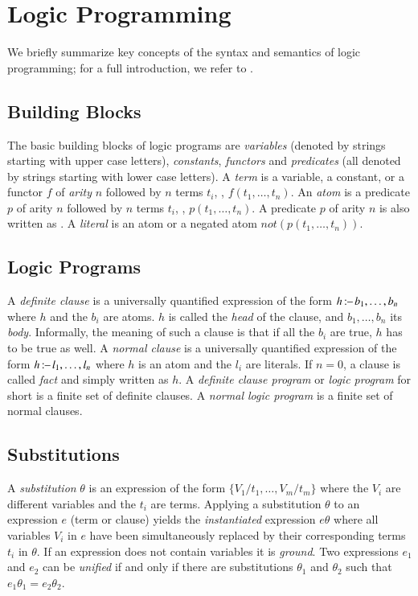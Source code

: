 \section{Logic Programming}
\label{app:lp_new}



We briefly summarize key concepts of the syntax and semantics of logic programming; for a full introduction, we refer to \citep{lloyd2012foundations}.

\subsection{Building Blocks}
The basic building blocks of logic programs are \emph{variables} (denoted by strings starting with upper case letters), \emph{constants}, \emph{functors} and
\emph{predicates} (all denoted by strings starting with lower case letters).  A \emph{term} is a variable, a constant, or a functor
$f$ of \emph{arity} $n$ followed by $n$ terms $t_i$, \ie,
$f(t_1,\dots,t_n)$. 
An \emph{atom} is a predicate $p$ of arity $n$ followed by $n$ terms $t_i$, \ie,
$p(t_1,\dots,t_n)$. A predicate $p$ of arity $n$ is also written as . A \emph{literal} is an
atom or a negated atom $ not(p(t_1,\dots,t_n))$.

\subsection{Logic Programs}

A \emph{definite clause} is a universally quantified expression of the form $h
\operatorname*{\mathtt{{:}{\---}}} b_1, \dots, b_n$ where $h$ and the $b_i$ are atoms.
$h$ is called the \emph{head} of the clause, and $b_1, \dots, b_n$ its
\emph{body}. Informally, the meaning of such a clause is that if all
the $b_i$ are true, $h$ has to be true as well. 
 A \emph{normal clause}  is a universally quantified expression of the form $h
\operatorname*{\mathtt{{:}{\---}}} l_1, \dots, l_n$ where $h$ is an atom and the $l_i$ are
literals.
If $n=0$, a clause is called \emph{fact} and simply written
as $h$.
A \emph{definite clause program} or \emph{logic program} for
short is a finite set of definite clauses. A \emph{normal logic
  program} is a finite set of normal clauses. 

\subsection{Substitutions}

A \emph{substitution} $\theta$ is an expression of the form
$\{V_1/t_1,\dots,V_m/t_m\}$ where the $V_i$ are different variables and
the $t_i$ are terms. Applying a substitution $\theta$ to an expression
$e$ (term or clause) yields the \emph{instantiated} expression $e\theta$
where all variables $V_i$ in $e$ have been simultaneously replaced by
their corresponding terms $t_i$ in $\theta$. If an expression does not
contain variables it is \emph{ground}. Two expressions $e_1$ and $e_2$ can be \emph{unified} if and only if there are substitutions $\theta_1$ and $\theta_2$ such that $e_1\theta_1 = e_2\theta_2$.

